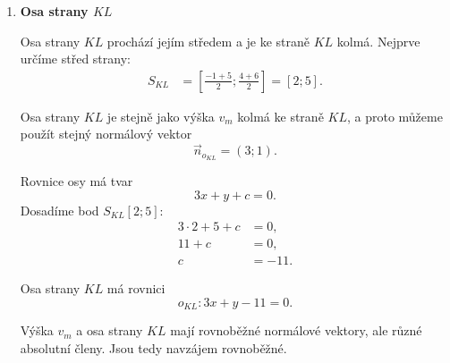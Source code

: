 \begin{example}
\begin{enumerate}[label=\alph*), leftmargin=2em]
        Výška $v_m$ je kolmá ke straně $KL$. Směrový vektor strany
        $KL$ je
        \[
            \overrightarrow{KL}
            =
            (5-(-1);6-4)
            =
            (6;2).
        \]
        Použijeme jednodušší vektor
        \[
            \vec{u}_{KL}=(3;1).
        \]

        Protože je výška $v_m$ ke straně $KL$ kolmá, může být vektor
        $\vec{u}_{KL}$ normálovým vektorem výšky:
        \[
            \vec{n}_{v_m}=(3;1).
        \]

        Rovnice výšky má tvar
        \[
            3x+y+c=0.
        \]
        Dosadíme vrchol $M[-3;-2]$:
        \begin{align*}
            3\cdot(-3)+(-2)+c&=0,\\
            -11+c&=0,\\
            c&=11.
        \end{align*}

        Výška $v_m$ má rovnici
        \[
            v_m: 3x+y+11=0.
        \]

        \item \textbf{Osa strany $KL$}

        Osa strany $KL$ prochází jejím středem a je ke straně $KL$
        kolmá. Nejprve určíme střed strany:
        \begin{align*}
            S_{KL}
            &=
            \left[
                \frac{-1+5}{2};
                \frac{4+6}{2}
            \right] = [2;5].
        \end{align*}

        Osa strany $KL$ je stejně jako výška $v_m$ kolmá ke straně
        $KL$, a proto můžeme použít stejný normálový vektor
        \[
            \vec{n}_{o_{KL}}=(3;1).
        \]

        Rovnice osy má tvar
        \[
            3x+y+c=0.
        \]
        Dosadíme bod $S_{KL}[2;5]$:
        \begin{align*}
            3\cdot2+5+c&=0,\\
            11+c&=0,\\
            c&=-11.
        \end{align*}

        Osa strany $KL$ má rovnici
        \[
            o_{KL}: 3x+y-11=0.
        \]

        Výška $v_m$ a osa strany $KL$ mají rovnoběžné normálové
        vektory, ale různé absolutní členy. Jsou tedy navzájem
        rovnoběžné.


\end{enumerate}
\end{example}
